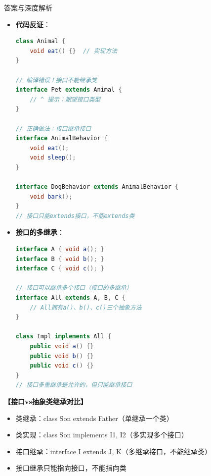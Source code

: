 \documentclass[12pt, a4paper]{ctexart}
\begin{document}
\begin{enumerate}[label=\textbf{\arabic*.}]
\begin{bluebox}{答案与深度解析}
\begin{itemize}[leftmargin=*, nosep, label={}]
\begin{itemize}[label={}, leftmargin=*, nosep]
\begin{lstlisting}[language=Java]
// javac错误信息：
// expected: 接口类型
// found: 类MyClass
// 接口只能继承其他接口
						      \end{lstlisting}
				            \item \textbf{代码反证}：
				                  \begin{lstlisting}[language=Java]
class Animal {
    void eat() {}  // 实现方法
}

// 编译错误！接口不能继承类
interface Pet extends Animal {
    // ^ 提示：期望接口类型
}

// 正确做法：接口继承接口
interface AnimalBehavior {
    void eat();
    void sleep();
}

interface DogBehavior extends AnimalBehavior {
    void bark();
}
// 接口只能extends接口，不能extends类
					      \end{lstlisting}
				            \item \textbf{接口的多继承}：
				                  \begin{lstlisting}[language=Java]
interface A { void a(); }
interface B { void b(); }
interface C { void c(); }

// 接口可以继承多个接口（接口的多继承）
interface All extends A, B, C {
    // All拥有a()、b()、c()三个抽象方法
}

class Impl implements All {
    public void a() {}
    public void b() {}
    public void c() {}
}
// 接口多重继承是允许的，但只能继承接口
					      \end{lstlisting}
			            \end{itemize}
		      \end{itemize}

		      \textbf{【接口vs抽象类继承对比】}
		      \begin{itemize}[label={}, nosep]
			      \item 类继承：class Son extends Father（单继承一个类）
			      \item 类实现：class Son implements I1, I2（多实现多个接口）
			      \item 接口继承：interface I extends J, K（多继承接口，不能继承类）
			      \item 接口继承只能指向接口，不能指向类
		      \end{itemize}


\end{bluebox}
\end{enumerate}
\end{document}
